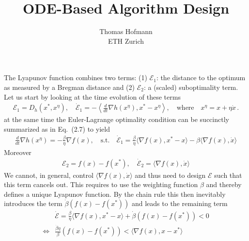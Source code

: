 \documentclass{article}
\title{ODE-Based Algorithm Design}
\author{Thomas Hofmann\\ ETH Zurich}
\newcommand{\ly}{{\mathcal E}}
\begin{document}
\maketitle

The Lyapunov function combines two terms: (1) $\ly_1$: the distance to the optimum as measured by a Bregman distance and (2) $\ly_2$: a (scaled) suboptimality term. Let us start by looking at the time evolution of these terms 
\begin{align}
\ly_1 = D_h(x^*,x^\eta), \quad 
\dot \ly_1 = -\left\langle\frac d{dt} {\nabla} h(x^\eta), x^* - x^\eta\right\rangle , \quad \text{where} 
\quad x^\eta = x + \eta \dot x \,.  
\end{align}
at the same time the Euler-Lagrange optimality condition can be succinctly summarized as in Eq.~(2.7) to yield
\begin{align}
\frac{d}{dt} \nabla h(x^\eta) = -\frac{\beta}{\eta} \nabla f(x), 
\quad \text{s.t.} \quad 
\dot \ly_1 = \frac \beta \eta \langle \nabla f (x), x^*-x \rangle - \beta \langle \nabla f (x), \dot x \rangle
\end{align}
Moreover 
\begin{align}
\ly_2 = f(x) - f(x^*), \quad \dot \ly_2 = \langle \nabla f(x), \dot x \rangle 
\end{align}
We cannot, in general,  control $ \langle \nabla f (x), \dot x \rangle$ and thus need to design $\ly$ such that this term  cancels out. This requires to use the weighting function $\beta$ and thereby defines a unique Lyapunov function. By the chain rule this then inevitably introduces the term $\dot \beta (f(x)-f(x^*))$  and leads to the remaining term 
\begin{align}
& \dot \ly  = \frac \beta \eta \langle \nabla f (x), x^*-x \rangle + \dot \beta (f(x) - f(x^*)) < 0 \\
\iff & 
\frac{\dot \beta \eta}{\beta} ( f(x) - f(x^*)) 
< 
\langle \nabla f (x), x-x^* \rangle 
\end{align}


\newpage
\end{document}
